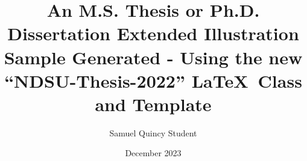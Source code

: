 \documentclass[phd]{ndsu-thesis-2022}
\title{An M.S. Thesis or Ph.D. Dissertation Extended Illustration Sample Generated - Using the new ``NDSU-Thesis-2022'' \LaTeX\ Class and Template}
\author{Samuel Quincy Student}
\date{December 2023}
\newcommand\italk[1]{\textcolor{blue}{#1}}  %
\begin{document}

\end{document}
